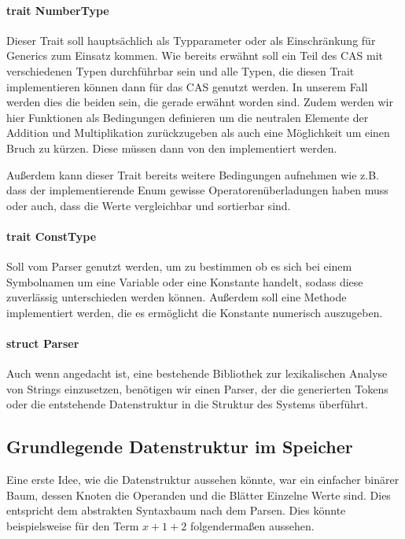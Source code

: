 \documentclass[11pt,a4paper, ngerman]{article}
\begin{document}
\paragraph{trait NumberType} Dieser Trait soll hauptsächlich als Typparameter oder als Einschränkung für Generics zum Einsatz kommen. Wie bereits erwähnt soll ein Teil des CAS mit verschiedenen Typen durchführbar sein und alle Typen, die diesen Trait implementieren können dann für das CAS genutzt werden. In unserem Fall werden dies die beiden  sein, die gerade erwähnt worden sind. Zudem werden wir hier Funktionen als Bedingungen definieren um die neutralen Elemente der Addition und Multiplikation zurückzugeben als auch eine Möglichkeit um einen Bruch zu kürzen. Diese müssen dann von den  implementiert werden.

Außerdem kann dieser Trait bereits weitere Bedingungen aufnehmen wie z.B. dass der implementierende Enum gewisse Operatorenüberladungen haben muss oder auch, dass die Werte vergleichbar und sortierbar sind.

\paragraph{trait ConstType} Soll vom Parser genutzt werden, um zu bestimmen ob es sich bei einem Symbolnamen um eine Variable oder eine Konstante handelt, sodass diese zuverlässig unterschieden werden können. Außerdem soll eine Methode implementiert werden, die es ermöglicht die Konstante numerisch auszugeben.

\paragraph{struct Parser} Auch wenn angedacht ist, eine bestehende Bibliothek zur lexikalischen Analyse von Strings einzusetzen, benötigen wir einen Parser, der die generierten Tokens oder die entstehende Datenstruktur in die Struktur des Systems überführt.

\subsection{Grundlegende Datenstruktur im Speicher}
Eine erste Idee, wie die Datenstruktur aussehen könnte, war ein einfacher binärer Baum, dessen Knoten die Operanden und die Blätter Einzelne Werte sind. Dies entspricht dem abstrakten Syntaxbaum nach dem Parsen. Dies könnte beispielsweise für den Term $x+1+2$ folgendermaßen aussehen.
\end{document}
